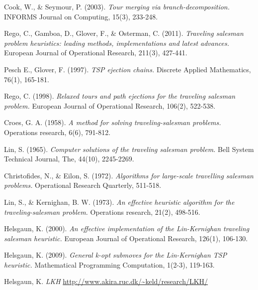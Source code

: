\documentclass[12pt]{article}
\begin{document}
%
%
\begin{thebibliography}{9}
        Cook, W., \& Seymour, P. (2003).
        \emph{Tour merging via branch-decomposition.}
        INFORMS Journal on Computing, 15(3), 233-248.

        Rego, C., Gamboa, D., Glover, F., \& Osterman, C. (2011).
        \emph{Traveling salesman problem heuristics: leading methods, implementations and latest advances.}
        European Journal of Operational Research, 211(3), 427-441.

        Pesch E., Glover, F. (1997).
        \emph{TSP ejection chains.}
        Discrete Applied Mathematics, 76(1), 165-181.

        Rego, C. (1998).
        \emph{Relaxed tours and path ejections for the traveling salesman problem.}
        European Journal of Operational Research, 106(2), 522-538.

        Croes, G. A. (1958).
        \emph{A method for solving traveling-salesman problems.}
        Operations research, 6(6), 791-812.

        Lin, S. (1965).
        \emph{Computer solutions of the traveling salesman problem.}
        Bell System Technical Journal, The, 44(10), 2245-2269.

        Christofides, N., \& Eilon, S. (1972).
        \emph{Algorithms for large-scale travelling salesman problems.}
        Operational Research Quarterly, 511-518.

        Lin, S., \& Kernighan, B. W. (1973).
        \emph{An effective heuristic algorithm for the traveling-salesman problem.}
        Operations research, 21(2), 498-516.

        Helsgaun, K. (2000).
        \emph{An effective implementation of the Lin-Kernighan traveling salesman heuristic.}
        European Journal of Operational Research, 126(1), 106-130.

        Helsgaun, K. (2009).
        \emph{General k-opt submoves for the Lin-Kernighan TSP heuristic.}
        Mathematical Programming Computation, 1(2-3), 119-163.

        Helsgaun, K.
        \emph{LKH}
        \url{http://www.akira.ruc.dk/~keld/research/LKH/}


\end{thebibliography}
\end{document}
